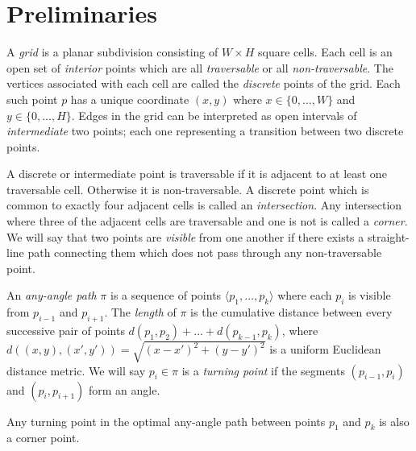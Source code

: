 \section{Preliminaries}
A \emph{grid} is a planar subdivision consisting of $W \times H$ square cells.
Each cell is an open set of \emph{interior} points which are 
all \emph{traversable} or all \emph{non-traversable}.
The vertices associated with each cell are called the
\emph{discrete} points of the grid. Each such point $p$ has a unique coordinate $(x, y)$
where $x \in \{0,\dots,W\}$ and $y \in \{0,\dots,H\}$.
Edges in the grid can be interpreted as open intervals of \emph{intermediate}
two points; each one representing a transition between two discrete points. 
\par
A discrete or intermediate point is traversable if it is adjacent to 
at least one traversable cell. Otherwise it is non-traversable.
A discrete point which is common to exactly four adjacent cells is called an \emph{intersection}.
Any intersection where three of the adjacent cells are traversable and one is not
is called a \emph{corner}.
We will say that two points are \emph{visible} from one another if there exists a 
straight-line path connecting them which does not pass through any non-traversable point.

An \emph{any-angle path} $\pi$ is a sequence of points 
$\langle p_1,\dots,p_k \rangle$ where each $p_{i}$ is visible from $p_{i-1}$
and $p_{i+1}$.
The \emph{length} of $\pi$ 
is the cumulative distance between every successive
pair of points $d(p_1,p_2) + \dots + d(p_{k-1},p_k)$, 
where $d((x,y), (x',y'))= \sqrt{(x-x')^2 + (y-y')^2}$ 
is a uniform Euclidean distance metric.
We will say $p_i \in \pi$ is a \emph{turning point} if the segments
$(p_{i-1}, p_i)$ and $(p_i, p_{i+1})$ form an angle.
\\
\begin{lemm}
\label{lemm::corner}
  Any turning point in the optimal any-angle path between points $p_1$ and 
$p_k$ is also a corner point.
\end{lemm}

